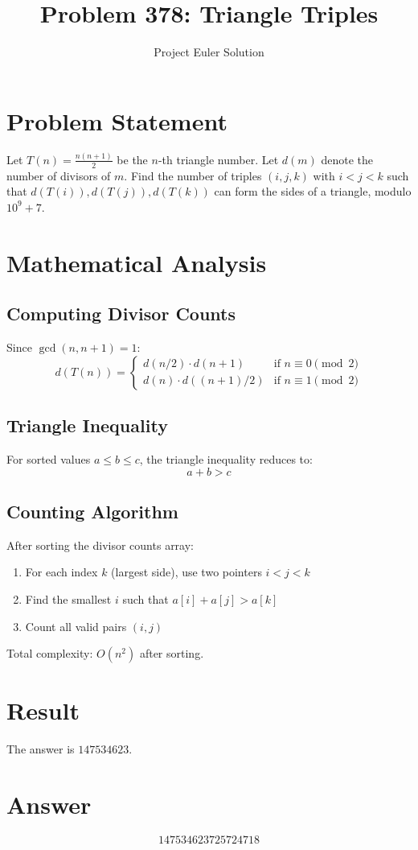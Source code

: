 \documentclass{article}
\title{Problem 378: Triangle Triples}
\author{Project Euler Solution}
\date{}
\begin{document}
\maketitle

\section{Problem Statement}
Let $T(n) = \frac{n(n+1)}{2}$ be the $n$-th triangle number. Let $d(m)$ denote the number of divisors of $m$. Find the number of triples $(i,j,k)$ with $i < j < k$ such that $d(T(i)), d(T(j)), d(T(k))$ can form the sides of a triangle, modulo $10^9 + 7$.

\section{Mathematical Analysis}

\subsection{Computing Divisor Counts}
Since $\gcd(n, n+1) = 1$:
\[
d(T(n)) = \begin{cases}
d(n/2) \cdot d(n+1) & \text{if } n \equiv 0 \pmod{2} \\
d(n) \cdot d((n+1)/2) & \text{if } n \equiv 1 \pmod{2}
\end{cases}
\]

\subsection{Triangle Inequality}
For sorted values $a \leq b \leq c$, the triangle inequality reduces to:
\[
a + b > c
\]

\subsection{Counting Algorithm}
After sorting the divisor counts array:
\begin{enumerate}
    \item For each index $k$ (largest side), use two pointers $i < j < k$
    \item Find the smallest $i$ such that $a[i] + a[j] > a[k]$
    \item Count all valid pairs $(i, j)$
\end{enumerate}

Total complexity: $O(n^2)$ after sorting.

\section{Result}
The answer is $\boxed{147534623}$.

\section{Answer}

\[
\boxed{147534623725724718}
\]
\end{document}
